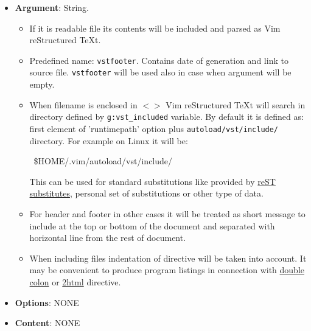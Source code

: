 \documentclass[12pt]{article}
\begin{document}
\begin{itemize}
\item
\textbf{Argument}: String.

 \begin{itemize}
\item
If it is readable file its contents will be included and parsed as Vim reStructured \TeX{}t.

\item
Predefined name: \texttt{vstfooter}. Contains date of generation and link to
source file. \texttt{vstfooter} will be used also in case when argument will be
empty.

\item
When filename is enclosed in $<$$>$ Vim reStructured \TeX{}t will search in directory defined by
\texttt{g:vst\_included} variable. By default it is defined as: first element of
'runtimepath' option plus \texttt{autoload/vst/include/} directory. For example
on Linux it will be:

\begin{ttfamily}\begin{flushleft}
\mbox{~\$HOME/.vim/autoload/vst/include/}\\
\end{flushleft}\end{ttfamily}

 This can be used for standard substitutions like provided by \href{http://docutils.sf.net/docs/ref/rst/substitutions.html\#character-entity-sets}{reST
 substitutes}, personal set of substitutions or other type of data.

\item
For header and footer in other cases it will be treated as short message
to include at the top or bottom of the document and separated with
horizontal line from the rest of document.

\item
When including files indentation of directive will be taken into account.
It may be convenient to produce program listings in connection with \href{\#ldouble-colon}{double
colon} or \href{\#l2html}{2html} directive.
\end{itemize}

\item
\textbf{Options}: NONE

\item
\textbf{Content}: NONE
\end{itemize}
\begin{center}
\end{center}
\end{document}
